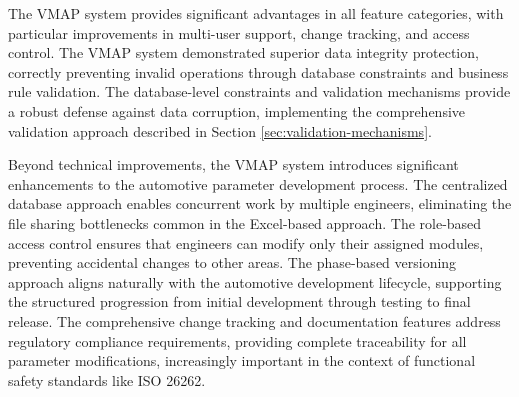 The \ac{VMAP} system provides significant advantages in all feature categories, with particular improvements in multi-user support, change tracking, and access control. The \ac{VMAP} system demonstrated superior data integrity protection, correctly preventing invalid operations through database constraints and business rule validation. The database-level constraints and validation mechanisms provide a robust defense against data corruption, implementing the comprehensive validation approach described in Section \ref{sec:validation-mechanisms}.

Beyond technical improvements, the \ac{VMAP} system introduces significant enhancements to the automotive parameter development process. The centralized database approach enables concurrent work by multiple engineers, eliminating the file sharing bottlenecks common in the Excel-based approach. The role-based access control ensures that engineers can modify only their assigned modules, preventing accidental changes to other areas. The phase-based versioning approach aligns naturally with the automotive development lifecycle, supporting the structured progression from initial development through testing to final release. The comprehensive change tracking and documentation features address regulatory compliance requirements, providing complete traceability for all parameter modifications, increasingly important in the context of functional safety standards like ISO 26262.